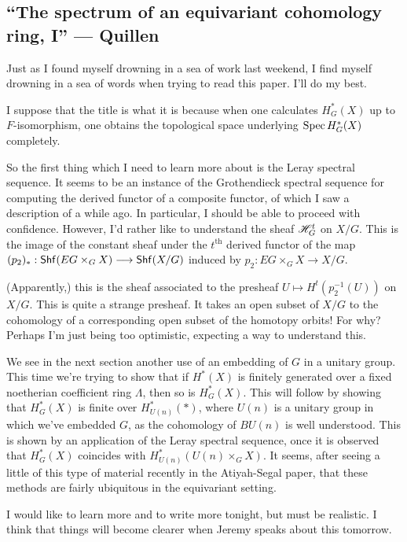 \documentclass[11pt]{article}
\newcommand{\KanSemResponse}[1]
{
\thispagestyle{fancy}
\section{#1}
}
\begin{document}
\begin{Quillen SpectrumOfEqCohomology}
\KanSemResponse
{``The spectrum of an equivariant cohomology ring, I'' --- Quillen}
Just as I found myself drowning in a sea of work last weekend, I find myself drowning in a sea of words when trying to read this paper. I'll do my best.

I suppose that the title is what it is because when one calculates $H^*_G(X)$ up to $F$-isomorphism, one obtains the topological space underlying $\operatorname{Spec} H^*_G(X)$ completely.

So the first thing which I need to learn more about is the Leray spectral sequence. It seems to be an instance of the Grothendieck spectral sequence for computing the derived functor of a composite functor, of which I saw a description of a while ago. In particular, I should be able to proceed with confidence. However, I'd rather like to understand the sheaf $\mathscr{H}_G^t$ on $X/G$. This is the image of the constant sheaf under the $t^\text{th}$ derived functor of the map $(p_2)_*:\operatorname{{\mathsf{Shf}}}(EG\times_G X)\longrightarrow \operatorname{{\mathsf{Shf}}}(X/G)$ induced by $p_2:EG\times_G X\to X/G$.

(Apparently,) this is the sheaf associated to the presheaf $U\mapsto H^t(p_2^{-1}(U))$ on $X/G$. This is quite a strange presheaf. It takes an open subset of $X/G$ to the cohomology of a corresponding open subset of the homotopy orbits! For why? Perhaps I'm just being too optimistic, expecting a way to understand this.

We see in the next section another use of an embedding of $G$ in a unitary group. This time we're trying to show that if $H^*(X)$ is finitely generated over a fixed noetherian coefficient ring $\Lambda$, then so is $H^*_G(X)$. This will follow by showing that $H^*_G(X)$ is finite over  $H^*_{U(n)}(\ast)$, where $U(n)$ is a unitary group in which we've embedded $G$, as the cohomology of $BU(n)$ is well understood. This is shown by an application of the Leray spectral sequence, once it is observed that $H^*_G(X)$ coincides with $H^*_{U(n)}(U(n)\times_G X)$. It seems, after seeing a little of this type of material recently in the Atiyah-Segal paper, that these methods are fairly ubiquitous in the equivariant setting.

I would like to learn more and to write more tonight, but must be realistic. I think that things will become clearer when Jeremy speaks about this tomorrow.

\pagebreak
\end{Quillen SpectrumOfEqCohomology}
\end{document}
